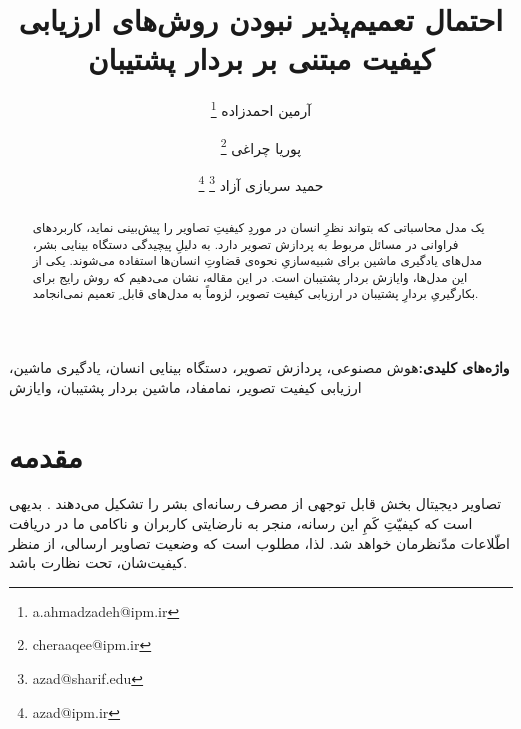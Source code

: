 \documentclass[twocolumn]{article}
\newcommand{\mykeyword}[1]{\par\textbf{واژه‌های کلیدی:}{#1}}
\begin{document}
\title{احتمال تعمیم‌پذیر نبودن روش‌های ارزیابی کیفیت مبتنی بر بردار پشتیبان}

\author[1]{آرمین احمدزاده \thanks{a.ahmadzadeh@ipm.ir}}
\author[2]{پوریا چراغی \thanks{cheraaqee@ipm.ir}}
\author[3]{حمید سربازی آزاد \thanks{azad@sharif.edu} \thanks{azad@ipm.ir}}
\date{}

\maketitle
\begin{abstract}
	یک مدل محاسباتی که بتواند نظرِ انسان در موردِ کیفیتِ تصاویر را پیش‌بینی نماید، کاربردهای فراوانی در مسائل مربوط به پردازش تصویر دارد. به دلیلِ پیچیدگی دستگاه بینایی بشر، مدل‌های یادگیری ماشین برای شبیه‌سازیِ نحوه‌ی قضاوتِ انسان‌ها استفاده می‌شوند. یکی از این مدل‌ها، وایازش بردار پشتیبان است. در این مقاله، نشان می‌دهیم که روش رایج برای بکارگیریِ بردارِ پشتیبان در ارزیابی کیفیت تصویر، لزوماً به مدل‌های قابل ِ تعمیم نمی‌انجامد.
\end{abstract}
\mykeyword{هوش مصنوعی، پردازش تصویر، دستگاه بینایی انسان، یادگیری ماشین، ارزیابی کیفیت تصویر، نمامفاد، ماشین بردار پشتیبان، وایازش }




\section{مقدمه}
\label{sec:intro}
تصاویر دیجیتال بخش قابل توجهی از مصرف رسانه‌ای بشر را تشکیل می‌دهند \cite{cisco}. بدیهی است که کیفیّتِ کَمِ این رسانه، منجر به نارضایتی کاربران و ناکامی ما در دریافت اطّلاعات مدّنظرمان خواهد شد. لذا، مطلوب است که وضعیت تصاویر ارسالی، از منظر کیفیت‌شان، تحت نظارت باشد.
\end{document}
